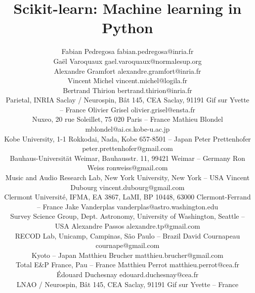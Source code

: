 \documentclass[twoside,11pt]{article}
\begin{document}
\title{Scikit-learn: Machine learning in Python}


\author{\name Fabian Pedregosa \email fabian.pedregosa@inria.fr \\
        \name Ga\"el Varoquaux \email gael.varoquaux@normalesup.org  \\
        \name Alexandre Gramfort \email alexandre.gramfort@inria.fr \\
        \name Vincent Michel  \email vincent.michel@logila.fr \\
        \name Bertrand Thirion  \email bertrand.thirion@inria.fr \\
        \addr Parietal, INRIA Saclay / Neurospin,
      B\^at 145, CEA Saclay, 91191 Gif sur Yvette -- {\sc France}
        \AND
        \name Olivier Grisel \email olivier.grisel@ensta.fr \\
        \addr Nuxeo, 20 rue Soleillet, 75 020 Paris -- {\sc France} 
        \AND
        \name Mathieu Blondel \email mblondel@ai.cs.kobe-u.ac.jp \\
        \addr Kobe University, 1-1 Rokkodai, Nada, Kobe 657-8501 -- {\sc Japan}
        \AND
        \name Peter Prettenhofer \email peter.prettenhofer@gmail.com \\
        \addr Bauhaus-Universit\"at Weimar, Bauhausstr. 11, 99421 Weimar -- {\sc Germany}
        \AND
        \name Ron Weiss \email ronweiss@gmail.com \\
        \addr Music and Audio Research Lab, New York University, New York -- {\sc USA}
        \AND
        \name Vincent Dubourg \email vincent.dubourg@gmail.com\\
        \addr Clermont Universit\'e, IFMA, EA 3867, LaMI,
        BP 10448, 63000 Clermont-Ferrand -- {\sc France}
        \AND
        \name Jake Vanderplas \email vanderplas@astro.washington.edu\\
        \addr Survey Science Group, Dept. Astronomy, University of Washington, Seattle -- {\sc USA}
  \AND
        \name Alexandre Passos \email alexandre.tp@gmail.com \\
        \addr RECOD Lab,  Unicamp,  Campinas, S\~ao Paulo -- {\sc Brazil}
        \AND
        \name David Cournapeau \email cournape@gmail.com \\
        \addr Kyoto -- {\sc Japan}
        \AND
        \name Matthieu Brucher \email matthieu.brucher@gmail.com \\
        \addr Total E\&P France,  Pau -- {\sc France}
        \AND
        \name Matthieu Perrot \email matthieu.perrot@cea.fr\\
        \name \'Edouard Duchesnay \email edouard.duchesnay@cea.fr \\
        \addr LNAO / Neurospin,
      B\^at 145, CEA Saclay, 91191 Gif sur Yvette -- {\sc France}
}
\end{document}
